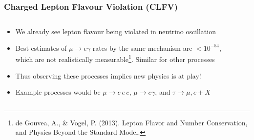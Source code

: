 \documentclass[11pt]{beamer}
\begin{document}
\begin{frame}
    \frametitle{Charged Lepton Flavour Violation (CLFV)}
    \begin{columns}[c]
        \begin{column}{0.6\textwidth}
            \begin{itemize}
                \item We already see lepton flavour being violated in neutrino oscillation
                \item Best estimates of $\mu \rightarrow e\gamma$ rates by the same mechanism are $<10^{-54}$, which are not realistically measurable\footnote[frame]{de Gouvea, A., \& Vogel, P. (2013). Lepton Flavor and Number Conservation, and Physics Beyond the Standard Model.}. Similar for other processes
                \item Thus observing these processes implies new physics is at play!
                \item Example processes would be $\mu\rightarrow e\,e\,e$, $\mu \rightarrow e\gamma$, and $\tau \rightarrow \mu,e + X$
            \end{itemize}
        \end{column}

        \begin{column}{0.4\textwidth}
        \end{column}
    \end{columns}
\end{frame}
\end{document}
